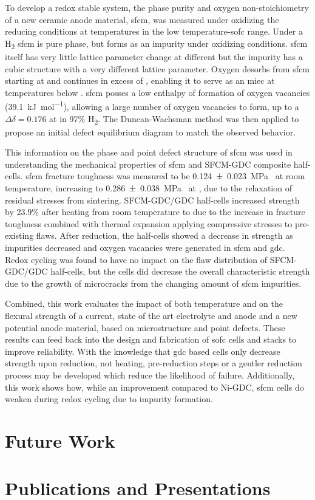 To develop a redox stable system, the phase purity and oxygen non-stoichiometry of a new ceramic anode material, \gls{sfcm}, was measured under oxidizing the reducing conditions at temperatures in the low temperature-\gls{sofc} range.
Under a H\textsubscript{2} \gls{sfcm} is pure phase, but forms  as an impurity under oxidizing conditions.
\Gls{sfcm} itself has very little lattice parameter change at different  but the impurity  has a cubic structure with a very different lattice parameter.
Oxygen desorbs from \Gls{sfcm} starting at  and continues in excess of , enabling it to serve as an \gls{miec} at temperatures below .
\Gls{sfcm} posses a low enthalpy of formation of oxygen vacancies (\SI{39.1}{\kilo\joule\per\mol}), allowing a large number of oxygen vacancies to form, up to a $\Delta\delta = 0.176$ at  in 97\% H\textsubscript{2}.
The Duncan-Wachsman method was then applied to propose an initial defect equilibrium diagram to match the observed behavior.

This information on the phase and point defect structure of \gls{sfcm} was used in understanding the mechanical properties of \gls{sfcm} and SFCM-GDC composite half-cells.
\Gls{sfcm} fracture toughness was measured to be \SI[separate-uncertainty = true]{0.124 +- 0.023}{\mega\pascal{}} at room temperature, increasing to \SI[separate-uncertainty = true]{0.286 +- 0.038}{\mega\pascal{}} at , due to the relaxation of residual stresses from sintering.
SFCM-GDC/GDC half-cells increased strength by 23.9\% after heating from room temperature to  due to the increase in fracture toughness combined with thermal expansion applying compressive stresses to pre-existing flaws.
After reduction, the half-cells showed a decrease in strength as impurities decreased and oxygen vacancies were generated in \gls{sfcm} and \gls{gdc}.
Redox cycling was found to have no impact on the flaw distribution of SFCM-GDC/GDC half-cells, but the cells did decrease the overall characteristic strength due to the growth of microcracks from the changing amount of \gls{sfcm} impurities.

Combined, this work evaluates the impact of both temperature and  on the flexural strength of a current, state of the art electrolyte and anode and a new potential anode material, based on microstructure and point defects.
These results can feed back into the design and fabrication of \gls{sofc} cells and stacks to improve reliability.
With the knowledge that \gls{gdc} based cells only decrease strength upon reduction, not heating, pre-reduction steps or a gentler reduction process may be developed which reduce the likelihood of failure.
Additionally, this work shows how, while an improvement compared to Ni-GDC, \gls{sfcm} cells do weaken during redox cycling due to impurity formation.

\section{Future Work}

\section{Publications and Presentations}
